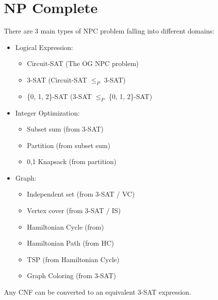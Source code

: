 \documentclass[9pt]{extarticle}
\begin{document}
\newpage
\section{NP Complete}
There are 3 main types of NPC problem falling into different domains:
\begin{itemize}
  \item Logical Expression: 
  \begin{itemize}
    \item Circuit-SAT (The OG NPC problem)
    \item 3-SAT (Circuit-SAT $\leq_P$ 3-SAT)
    \item \{0, 1, 2\}-SAT (3-SAT $\leq_P$ \{0, 1, 2\}-SAT)
  \end{itemize}
  \item Integer Optimization:
  \begin{itemize}
    \item Subset sum (from 3-SAT)
    \item Partition (from subset sum)
    \item 0,1 Knapsack (from partition)
  \end{itemize}
  \item Graph: 
  \begin{itemize}
    \item Independent set (from 3-SAT / VC)
    \item Vertex cover (from 3-SAT / IS)
    \item Hamiltonian Cycle (from)
    \item Hamiltonian Path (from HC)
    \item TSP (from Hamiltonian Cycle)
    \item Graph Coloring (from 3-SAT)
  \end{itemize}
\end{itemize}
Any CNF can be converted to an equivalent 3-SAT expression.
\end{document}
